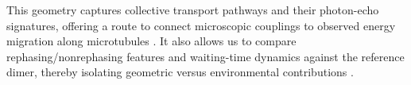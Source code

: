 This geometry captures collective transport pathways and their photon-echo signatures, offering a route to connect microscopic couplings to observed energy migration along microtubules \cite{kalraetal2023electronicenergymigration}. It also allows us to compare rephasing/nonrephasing features and waiting-time dynamics against the reference dimer, thereby isolating geometric versus environmental contributions \cite{mukamel1995principlesnonlinearoptical,segarra-martietal2018accuratesimulationtwodimensional}.